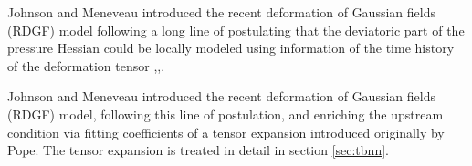Johnson and Meneveau \cite{johnson2016} introduced the recent deformation of Gaussian fields (RDGF) model following a long line of postulating that the deviatoric part of the pressure Hessian could be locally modeled using information of the time history of the deformation tensor \cite{chertkov1999},\cite{chevillard2006lagrangian},\cite{chevillard2008modeling}. 

Johnson and Meneveau \cite{johnson2016} introduced the recent deformation of Gaussian fields (RDGF) model, following this line of postulation, and enriching the upstream condition via fitting coefficients of a tensor expansion introduced originally by Pope\cite{pope1975more}. The tensor expansion is treated in detail in section \ref{sec:tbnn}.

